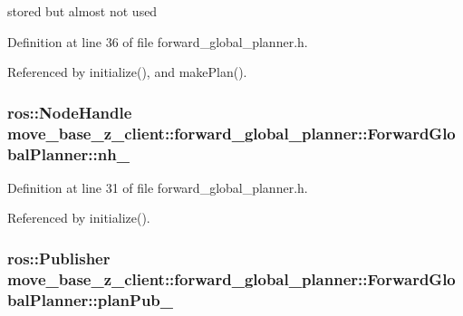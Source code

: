 stored but almost not used 



Definition at line 36 of file forward\+\_\+global\+\_\+planner.\+h.



Referenced by initialize(), and make\+Plan().

\subsubsection[{\texorpdfstring{nh\+\_\+}{nh_}}]{\setlength{\rightskip}{0pt plus 5cm}ros\+::\+Node\+Handle move\+\_\+base\+\_\+z\+\_\+client\+::forward\+\_\+global\+\_\+planner\+::\+Forward\+Global\+Planner\+::nh\+\_\+\hspace{0.3cm}{\ttfamily [private]}}\hypertarget{classmove__base__z__client_1_1forward__global__planner_1_1ForwardGlobalPlanner_a3302fa193a6f9819514bd0990286b197}{}\label{classmove__base__z__client_1_1forward__global__planner_1_1ForwardGlobalPlanner_a3302fa193a6f9819514bd0990286b197}


Definition at line 31 of file forward\+\_\+global\+\_\+planner.\+h.



Referenced by initialize().

\subsubsection[{\texorpdfstring{plan\+Pub\+\_\+}{planPub_}}]{\setlength{\rightskip}{0pt plus 5cm}ros\+::\+Publisher move\+\_\+base\+\_\+z\+\_\+client\+::forward\+\_\+global\+\_\+planner\+::\+Forward\+Global\+Planner\+::plan\+Pub\+\_\+\hspace{0.3cm}{\ttfamily [private]}}\hypertarget{classmove__base__z__client_1_1forward__global__planner_1_1ForwardGlobalPlanner_a324f5df4d47440e1ebddb83ee53d5908}{}\label{classmove__base__z__client_1_1forward__global__planner_1_1ForwardGlobalPlanner_a324f5df4d47440e1ebddb83ee53d5908}


